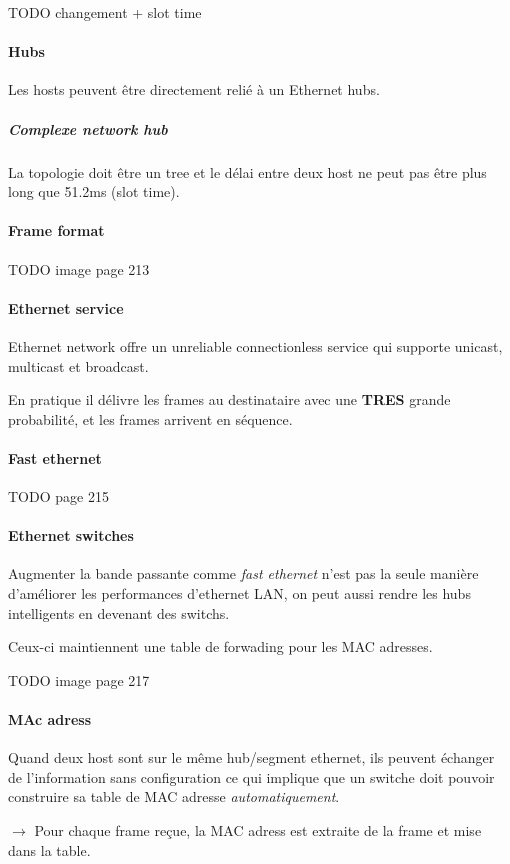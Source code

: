     
    
TODO changement + slot time

\paragraph{Hubs}
Les hosts peuvent être directement relié à un Ethernet hubs.
\subparagraph{Complexe network hub} La topologie doit être un tree et le délai entre
deux host ne peut pas être plus long que 51.2ms (slot time).

\paragraph{Frame format}
TODO image page 213

\paragraph{Ethernet service}
Ethernet network offre un unreliable connectionless service qui supporte unicast, multicast et
broadcast.

En pratique il délivre les frames au destinataire avec une \textbf{TRES} grande probabilité,
et les frames arrivent en séquence.

\paragraph{Fast ethernet}
TODO page 215

\paragraph{Ethernet switches}
Augmenter la bande passante comme \textit{fast ethernet} n'est pas la seule
manière d'améliorer les performances d'ethernet LAN, on peut aussi rendre
les hubs intelligents en devenant des switchs.

Ceux-ci maintiennent une table de forwading pour les MAC adresses.

TODO image page 217


\paragraph{MAc adress}
Quand deux host sont sur le même hub/segment ethernet, ils peuvent échanger de
l'information sans configuration ce qui implique que un switche doit pouvoir
construire sa table de MAC adresse \textit{automatiquement}.

$\rightarrow$ Pour chaque frame reçue, la MAC adress est extraite de la frame et mise dans la table.

